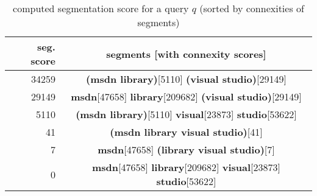 \begin{table}[t]
 \caption{computed segmentation score for a query $q$ (sorted by connexities of segments)}
 \label{table-connexity-score-risvik-2003}
 \centering
 \small
 \begin{tabular}{@{}rc@{}}
  \toprule
  seg. score & segments [with connexity scores] \\
  \midrule
  34259      & \textbf{(msdn library)}[5110] \textbf{(visual studio)}[29149]  \\
  29149      & \textbf{msdn}[47658] \textbf{library}[209682] \textbf{(visual studio)}[29149]  \\
  5110       & \textbf{(msdn library)}[5110] \textbf{visual}[23873] \textbf{studio}[53622]  \\
  41      	 & \textbf{(msdn library visual studio)}[41]  \\
  7		     & \textbf{msdn}[47658] \textbf{(library visual studio)}[7]  \\
  0 		     & \textbf{msdn}[47658] \textbf{library}[209682] \textbf{visual}[23873] \textbf{studio}[53622]  \\
  \bottomrule
 \end{tabular}
\end{table}
